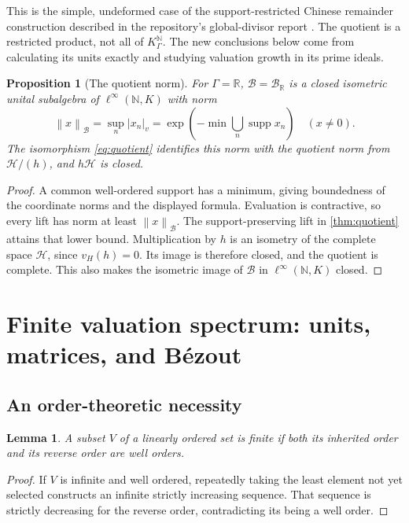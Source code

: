 \documentclass[11pt,letterpaper]{article}
\numberwithin{equation}{section}
\newtheorem{proposition}[theorem]{Proposition}
\newtheorem{lemma}[theorem]{Lemma}
\theoremstyle{definition}
\theoremstyle{remark}
\newcommand{\R}{\mathbb R}
\newcommand{\N}{\mathbb N}
\newcommand{\HH}{\mathcal H}
\newcommand{\BB}{\mathcal B}
\newcommand{\vH}{v_{\!H}}
\newcommand{\supp}{\operatorname{supp}}
\newcommand{\norm}[1]{\left\lVert#1\right\rVert}
\begin{document}
This is the simple, undeformed case of the support-restricted Chinese
remainder construction described in the repository's global-divisor
report \cite[\S10]{RepoGlobal}. The quotient is a restricted product,
not all of $K_\Gamma^\N$. The new conclusions below come from calculating
its units exactly and studying valuation growth in its prime ideals.

\begin{proposition}[The quotient norm]\label{prop:Bnorm}
For $\Gamma=\R$, $\BB=\BB_\R$ is a closed isometric unital subalgebra of
$\ell^\infty(\N,K)$ with norm
\[
 \norm{x}_{\BB}=\sup_n|x_n|_v
  =\exp\left(-\min\bigcup_n\supp x_n\right)\quad(x\ne0).
\]
The isomorphism \eqref{eq:quotient} identifies this norm with the quotient
norm from $\HH/(h)$, and $h\HH$ is closed.
\end{proposition}
\begin{proof}
A common well-ordered support has a minimum, giving boundedness of the
coordinate norms and the displayed formula. Evaluation is contractive,
so every lift has norm at least $\norm x_\BB$. The support-preserving
lift in \cref{thm:quotient} attains that lower bound. Multiplication by
$h$ is an isometry of the complete space $\HH$, since $\vH(h)=0$.
Its image is therefore closed, and the quotient is complete. This also
makes the isometric image of $\BB$ in $\ell^\infty(\N,K)$ closed.
\end{proof}

\section{Finite valuation spectrum: units, matrices, and B\'ezout}
\label{sec:units}

\subsection{An order-theoretic necessity}
\begin{lemma}\label{lem:two-orders}
A subset $V$ of a linearly ordered set is finite if both its inherited
order and its reverse order are well orders.
\end{lemma}
\begin{proof}
If $V$ is infinite and well ordered, repeatedly taking the least element
not yet selected constructs an infinite strictly increasing sequence.
That sequence is strictly decreasing for the reverse order, contradicting
its being a well order.
\end{proof}
\end{document}
